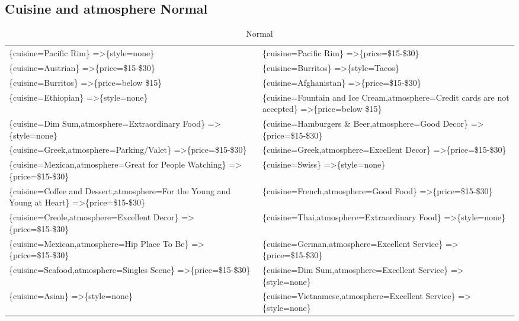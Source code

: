 \documentclass[letterpaper,10pt]{article}
\begin{document}
\begin{appendices}
\subsection*{Cuisine and atmosphere Normal}
\begin{table}[h]
\centering
\caption*{Normal}
\begin{adjustbox}{max width=\textwidth}
\begin{tabular}{ll}
\{cuisine=Pacific Rim\} =\textgreater \{style=none\} & \{cuisine=Pacific Rim\} =\textgreater \{price=\$15-\$30\} \\ 
\{cuisine=Austrian\} =\textgreater \{price=\$15-\$30\} & \{cuisine=Burritos\} =\textgreater \{style=Tacos\} \\ 
\{cuisine=Burritos\} =\textgreater \{price=below \$15\} & \{cuisine=Afghanistan\} =\textgreater \{price=\$15-\$30\} \\ 
\{cuisine=Ethiopian\} =\textgreater \{style=none\} & \{cuisine=Fountain and Ice Cream,atmosphere=Credit cards are not accepted\} =\textgreater \{price=below \$15\} \\ 
\{cuisine=Dim Sum,atmosphere=Extraordinary Food\} =\textgreater \{style=none\} & \{cuisine=Hamburgers \& Beer,atmosphere=Good Decor\} =\textgreater \{price=\$15-\$30\} \\ 
\{cuisine=Greek,atmosphere=Parking/Valet\} =\textgreater \{price=\$15-\$30\} & \{cuisine=Greek,atmosphere=Excellent Decor\} =\textgreater \{price=\$15-\$30\} \\ 
\{cuisine=Mexican,atmosphere=Great for People Watching\} =\textgreater \{price=\$15-\$30\} & \{cuisine=Swiss\} =\textgreater \{style=none\} \\ 
\{cuisine=Coffee and Dessert,atmosphere=For the Young and Young at Heart\} =\textgreater \{price=\$15-\$30\} & \{cuisine=French,atmosphere=Good Food\} =\textgreater \{price=\$15-\$30\} \\ 
\{cuisine=Creole,atmosphere=Excellent Decor\} =\textgreater \{price=\$15-\$30\} & \{cuisine=Thai,atmosphere=Extraordinary Food\} =\textgreater \{style=none\} \\ 
\{cuisine=Mexican,atmosphere=Hip Place To Be\} =\textgreater \{price=\$15-\$30\} & \{cuisine=German,atmosphere=Excellent Service\} =\textgreater \{price=\$15-\$30\} \\ 
\{cuisine=Seafood,atmosphere=Singles Scene\} =\textgreater \{price=\$15-\$30\} & \{cuisine=Dim Sum,atmosphere=Excellent Service\} =\textgreater \{style=none\} \\ 
\{cuisine=Asian\} =\textgreater \{style=none\} & \{cuisine=Vietnamese,atmosphere=Excellent Service\} =\textgreater \{style=none\} \\ 

\end{tabular}
\end{adjustbox}
\end{table}
\end{appendices}
\end{document}
